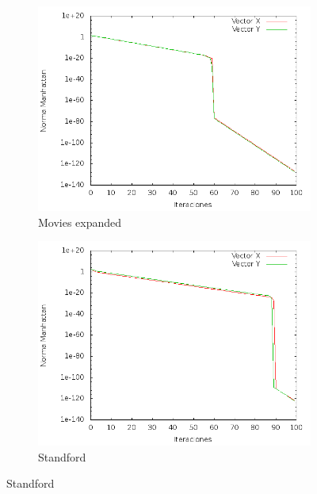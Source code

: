 \begin{figure}[!htb]
\begin{subfigure}{.5\textwidth}
    \includegraphics[scale=0.4]{imagenes/hits-movie.png}
    \caption{Movies expanded }
\end{subfigure}
\begin{subfigure}{.5\textwidth}
    \includegraphics[scale=0.4]{imagenes/hits-stadfor.png}
    \caption{Standford}
\end{subfigure}
\end{figure}

